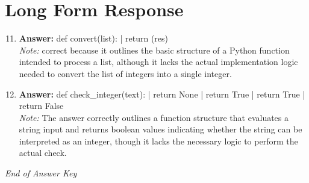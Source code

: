\documentclass[12pt]{article}
\begin{document}
\section*{Long Form Response}
\begin{enumerate}[label=\arabic*.]
\setcounter{enumi}{10}
\item \textbf{Answer:} def convert(list): | return (res)
\\ \textit{Note:} correct because it outlines the basic structure of a Python function intended to process a list, although it lacks the actual implementation logic needed to convert the list of integers into a single integer.
\item \textbf{Answer:} def check\_integer(text): | return None | return True | return True | return False
\\ \textit{Note:} The answer correctly outlines a function structure that evaluates a string input and returns boolean values indicating whether the string can be interpreted as an integer, though it lacks the necessary logic to perform the actual check.
\end{enumerate}

\vfill
\noindent\textit{End of Answer Key}
\end{document}
